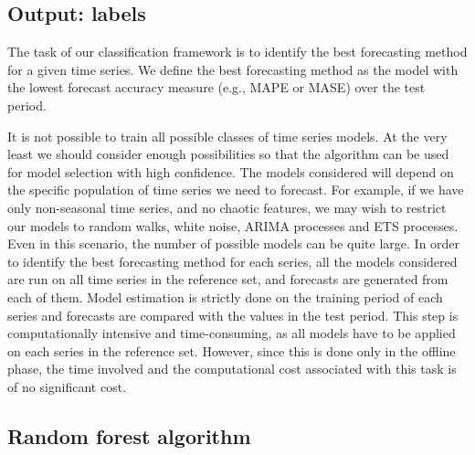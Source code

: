 \documentclass[11pt,a4paper,]{article}
\theoremstyle{definition}
\theoremstyle{definition}
\theoremstyle{definition}
\theoremstyle{remark}
\begin{document}
\subsection{Output: labels}\label{output-labels}

The task of our classification framework is to identify the best
forecasting method for a given time series. We define the best
forecasting method as the model with the lowest forecast accuracy
measure (e.g., MAPE or MASE) over the test period.

It is not possible to train all possible classes of time series models.
At the very least we should consider enough possibilities so that the
algorithm can be used for model selection with high confidence. The
models considered will depend on the specific population of time series
we need to forecast. For example, if we have only non-seasonal time
series, and no chaotic features, we may wish to restrict our models to
random walks, white noise, ARIMA processes and ETS processes. Even in
this scenario, the number of possible models can be quite large. In
order to identify the best forecasting method for each series, all the
models considered are run on all time series in the reference set, and
forecasts are generated from each of them. Model estimation is strictly
done on the training period of each series and forecasts are compared
with the values in the test period. This step is computationally
intensive and time-consuming, as all models have to be applied on each
series in the reference set. However, since this is done only in the
offline phase, the time involved and the computational cost associated
with this task is of no significant cost.

\subsection{Random forest algorithm}\label{random-forest-algorithm}
\end{document}
